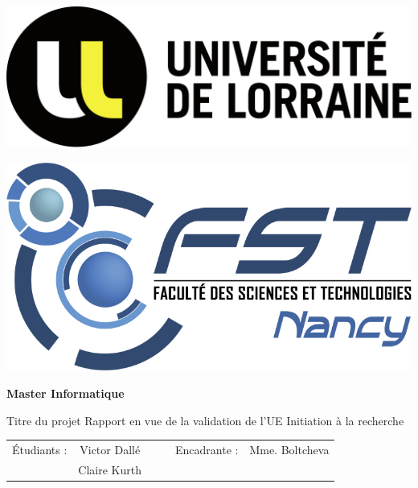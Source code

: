 \documentclass[11pt]{article}
\begin{document}
\begin{titlepage}
    \begin{center}

        \begin{minipage}[b]{0.3\textwidth}
        \includegraphics[width=\textwidth]{images/Logo_Universite_de_Lorraine.png}
        \end{minipage}
        \begin{minipage}[b]{0.2\textwidth}
            \centering
            \includegraphics[width=\textwidth]{images/logo-fst-format-jpg-couleur.jpg}
        \end{minipage}
        \smallbreak
        \vspace{0.5cm}
        \textbf{\large Master Informatique}

        \vfill
        {\Large Titre du projet} \smallbreak
        Rapport \smallbreak en vue de la validation de l'UE Initiation à la recherche \smallbreak
        \vfill
        \begin{tabular}{ccc|ccc}
            \'Etudiants : & Victor Dallé & & & Encadrante : & Mme. Boltcheva \\
            & Claire Kurth & & & & 
            
        \end{tabular}
    \end{center}

\end{titlepage}
\end{document}
